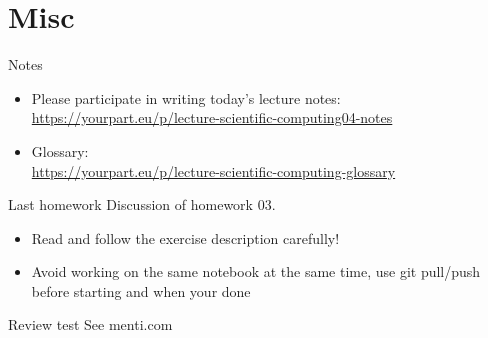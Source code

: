 
\subtitle{Numpy and the Python Scientific Ecosystem}
\date{2020-04-30}


\begin{frame}
	\tableofcontents
\end{frame}

\section{Misc}
\begin{frame}{Notes}
	\begin{itemize}
		\item Please participate in writing today's lecture notes:
            \href{https://yourpart.eu/p/lecture-scientific-computing04-notes}{https://yourpart.eu/p/lecture-scientific-computing04-notes}
        \item Glossary:\\
            \href{https://yourpart.eu/p/lecture-scientific-computing-glossary}{https://yourpart.eu/p/lecture-scientific-computing-glossary}
	\end{itemize}
\end{frame}

\begin{frame}{Last homework}
    Discussion of homework 03.
    \bigskip
    \pause

	\begin{itemize}
        \item Read and follow the exercise description carefully!
        \item Avoid working on the same notebook at the same time, use git pull/push before
            starting and when your done
	\end{itemize}
\end{frame}

\begin{frame}{Review test}
    See menti.com
\end{frame}


